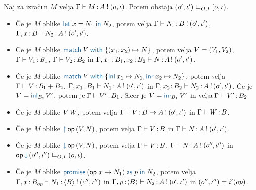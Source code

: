\begin{lema}\label{lem:inversion-lema}
	Naj za izračun $M$ velja $\Gamma \vdash M \mathinner{:} A \mathbin{!} (o, \iota)$. Potem obstaja $(o', \iota') \sqsubseteq_{O, I} (o, \iota)$.
	\begin{itemize}
		\item Če je $M$ oblike $\tmlet{x}{N_1}{N_2}$, potem velja $\Gamma \vdash N_1 \mathinner{:} B \mathbin{!} (o', \iota')$, $\Gamma, x \mathinner{:} B \vdash N_2 \mathinner{:} A \mathbin{!} (o', \iota')$.
	
		\item Če je $M$ oblike $\tmmatch{V}{\tmpair{x_1}{x_2} \mapsto N}$, potem velja $V = ( V_1 , V_2 )$, $\Gamma \vdash V_1 \mathinner{:} B_1$, $\Gamma \vdash V_2 \mathinner{:} B_2$ in $\Gamma, x_1 \mathinner{:} B_1, x_2 \mathinner{:} B_2 \vdash N \mathinner{:} A \mathbin{!} (o', \iota')$.
		
		\item Če je $M$ oblike $\tmmatch{V}{\tminl{x_1} \mapsto N_1, \tminr{x_2} \mapsto N_2}$, potem velja $\Gamma \vdash V \mathinner{:} B_1 + B_2$, $\Gamma, x_1 \mathinner{:} B_1 \vdash N_1 \mathinner{:} A \mathbin{!} (o', \iota')$ in $\Gamma, x_2 \mathinner{:} B_2 \vdash N_2 \mathinner{:} A \mathbin{!} (o', \iota')$. Če je $V = \tminl[B_2]{V'}$, potem je $\Gamma \vdash V' \mathinner{:} B_1$. Sicer je $V = \tminr[B_1]{V'}$ in velja $\Gamma \vdash V' \mathinner{:} B_2$
		
		
		\item Če je $M$ oblike $V\,W$, potem velja $\Gamma \vdash V \mathinner{:} B \to A \mathbin{!} (o', \iota')$ in $\Gamma \vdash W \mathinner{:} B$.
		
		\item Če je $M$ oblike $\tmopout{op}{V}{N}$, potem velja $\Gamma \vdash V \mathinner{:} B$ in $\Gamma \vdash N \mathinner{:} A \mathbin{!} (o', \iota')$.
		
		\item Če je $M$ oblike $\tmopin{op}{V}{N}$, potem velja $\Gamma \vdash V \mathinner{:} B$, $\Gamma \vdash N \mathinner{:} A \mathbin{!} (o'', \iota'')$ in $\opincomp{op}{(\o'', \i'')} \order{O, I} (\o, \i)$.
		
		\item Če je $M$ oblike $\tmwith{op}{x}{N_1}{p}{N_2}$, potem velja $\Gamma, x \mathinner{:} B_{op} \vdash N_1 \mathinner{:} \langle B \rangle \mathbin{!} (o'', \iota'')$ in $\Gamma, p \mathinner{:} \langle B \rangle \vdash N_2 \mathinner{:} A \mathbin{!} (o', \iota')$ in $(o'', \iota'') = i'(op)$.
		
	\end{itemize}
\end{lema}

